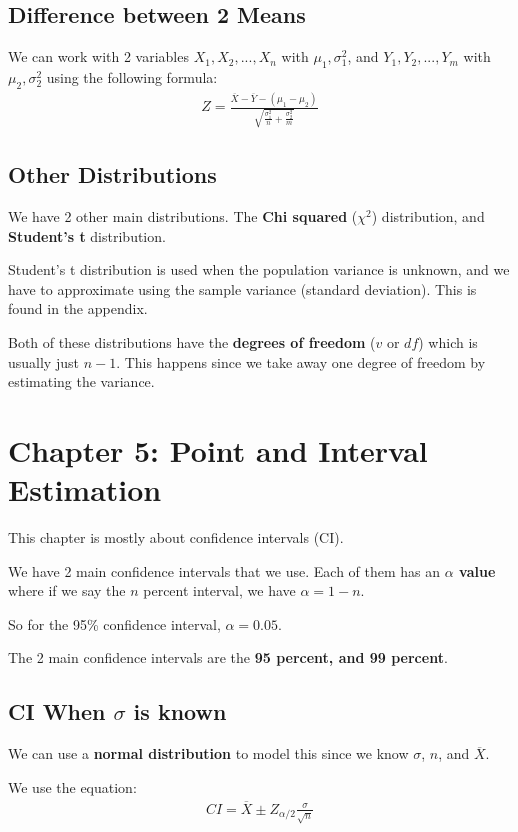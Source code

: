 \documentclass[12pt,letterpaper]{article} \usepackage{amsmath} \usepackage{graphicx} \usepackage[margin=1in]{geometry} \usepackage{longtable}  \usepackage{amssymb}
\begin{document}
	\subsection{Difference between 2 Means}
	We can work with 2 variables $X_1, X_2, ..., X_n$ with $\mu_1, \sigma^2_1$, and $Y_1, Y_2, ..., Y_m$ with $\mu_2, \sigma_2^2$ using the following formula:
	\begin{align*}
		Z = \frac{\overline X - \overline Y - (\mu_1 - \mu_2)}{\sqrt{\frac{\sigma_1^2}{n}+\frac{\sigma^2_2}{m}}}
	\end{align*}

	\subsection{Other Distributions}
	We have 2 other main distributions. The \textbf{Chi squared} ($\chi^2$) distribution, and \textbf{Student's t} distribution. 
	
	Student's t distribution is used when the population variance is unknown, and we have to approximate using the sample variance (standard deviation). This is found in the appendix.
	
	Both of these distributions have the \textbf{degrees of freedom} ($v$ or $df$) which is usually just $n-1$. This happens since we take away one degree of freedom by estimating the variance. 
	
	\section{Chapter 5: Point and Interval Estimation} 
	This chapter is mostly about confidence intervals (CI). 
	
	We have 2 main confidence intervals that we use. Each of them has an \textbf{$\alpha$ value} where if we say the $n$ percent interval, we have $\alpha = 1-n$.
	
	So for the 95\% confidence interval, $\alpha = 0.05$. 
	
	The 2 main confidence intervals are the \textbf{95 percent, and 99 percent}. 
	
	\subsection{CI When $\sigma$ is known}
	We can use a \textbf{normal distribution} to model this since we know $\sigma$, $n$, and $\overline X$. 
	
	We use the equation:
	\begin{align*}
		CI = \overline X \pm Z_{\alpha/2} \frac{\sigma}{\sqrt n}
	\end{align*}
\end{document}
